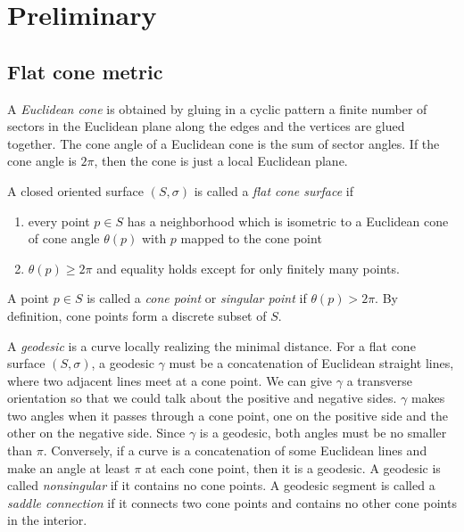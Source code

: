 \documentclass[reqno]{amsart}
\theoremstyle{plain}
\theoremstyle{definition}
\theoremstyle{remark}
\theoremstyle{definition}
\newcommand{\?}{\textcolor{red}{?}}
\begin{document}
\section{Preliminary}

\subsection{Flat cone metric}
A \textit{Euclidean cone} is obtained by gluing in a cyclic pattern a finite number of sectors in the Euclidean plane along the edges and the vertices are glued together. The cone angle of a Euclidean cone is the sum of  sector angles. If the cone angle is $2\pi$, then the cone is just a local Euclidean plane.

A closed oriented surface $(S,\sigma)$ is called a \textit{flat cone surface} if 
\begin{enumerate}
    \item[(1)] every point $p\in S$ has a neighborhood which is isometric to a Euclidean cone of cone angle $\theta(p)$ with $p$ mapped to the cone point
    \item[(2)] $\theta(p)\ge 2\pi$ and equality holds except for only finitely many points.
\end{enumerate}
A point $p\in S$ is called a \textit{cone point} or \textit{singular point} if $\theta(p)> 2\pi$. By definition, cone points form a discrete subset of $S$.

A \textit{geodesic} is a curve locally realizing the minimal distance. For a flat cone surface $(S,\sigma)$, a geodesic $\gamma$ must be a concatenation of Euclidean straight lines, where two adjacent lines meet at a cone point. We can give $\gamma$ a transverse orientation so that we could talk about the positive and negative sides. $\gamma$ makes two angles when it passes through a cone point, one on the positive side and the other on the negative side. Since $\gamma$ is a geodesic, both angles must be no smaller than $\pi$. Conversely, if a curve is a concatenation of some Euclidean lines and make an angle at least $\pi$ at each cone point, then it is a geodesic. A geodesic is called \textit{nonsingular} if it contains no cone points. A geodesic segment is called a \textit{saddle connection} if it connects two cone points and contains no other cone points in the interior.
\end{document}
